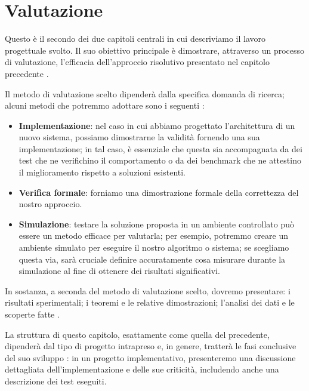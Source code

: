 \chapter{Valutazione}
\label{chap:valutazione}

\acresetall

Questo è il secondo dei due capitoli centrali in cui descriviamo il lavoro progettuale svolto. Il suo obiettivo principale è dimostrare, attraverso un processo di valutazione, l'efficacia dell'approccio risolutivo presentato nel capitolo precedente \cite{pfandzelter2022thesis}.

\medskip

Il metodo di valutazione scelto dipenderà dalla specifica domanda di ricerca; alcuni metodi che potremmo adottare sono i seguenti \cite{pfandzelter2022thesis}:
\begin{itemize}

\item \textbf{Implementazione}: nel caso in cui abbiamo progettato l'architettura di un nuovo sistema, possiamo dimostrarne la validità fornendo una sua implementazione; in tal caso, è essenziale che questa sia accompagnata da dei test che ne verifichino il comportamento o da dei benchmark che ne attestino il miglioramento rispetto a soluzioni esistenti.

\item \textbf{Verifica formale}: forniamo una dimostrazione formale della correttezza del nostro approccio.

\item \textbf{Simulazione}: testare la soluzione proposta in un ambiente controllato può essere un metodo efficace per valutarla; per esempio, potremmo creare un ambiente simulato per eseguire il nostro algoritmo o sistema; se scegliamo questa via, sarà cruciale definire accuratamente cosa misurare durante la simulazione al fine di ottenere dei risultati significativi.

\end{itemize}

In sostanza, a seconda del metodo di valutazione scelto, dovremo presentare: i risultati sperimentali; i teoremi e le relative dimostrazioni; l'analisi dei dati e le scoperte fatte  \cite{zobel2015writing}.

\medskip

La struttura di questo capitolo, esattamente come quella del precedente, dipenderà dal tipo di progetto intrapreso e, in genere, tratterà le fasi conclusive del suo sviluppo \cite{unibz2022thesis}: in un progetto implementativo, presenteremo una discussione dettagliata dell'implementazione e delle sue criticità, includendo anche una descrizione dei test eseguiti.

